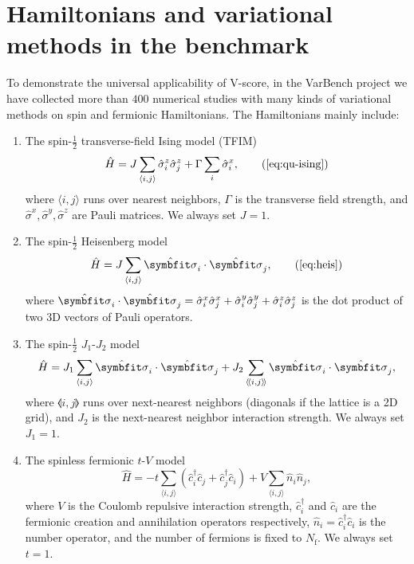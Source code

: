 \section{Hamiltonians and variational methods in the benchmark}

To demonstrate the universal applicability of V-score, in the VarBench project we have collected more than $400$ numerical studies with many kinds of variational methods on spin and fermionic Hamiltonians. The Hamiltonians mainly include:
\begin{enumerate}
\item The spin-$\frac{1}{2}$ transverse-field Ising model (TFIM)
\begin{equation}
\hat{H} = J \sum_{\langle i, j \rangle} \hat{\sigma}^z_i \hat{\sigma}^z_j
+ \Gamma \sum_i \hat{\sigma}^x_i,
\tag{\ref{eq:qu-ising}}
\end{equation}
where $\langle i, j \rangle$ runs over nearest neighbors, $\Gamma$ is the transverse field strength, and $\hat{\sigma}^x, \hat{\sigma}^y, \hat{\sigma}^z$ are Pauli matrices. We always set $J = 1$.

\item The spin-$\frac{1}{2}$ Heisenberg model
\begin{equation}
\hat{H} = J \sum_{\langle i, j \rangle} \hat{\vsi}_i \cdot \hat{\vsi}_j,
\tag{\ref{eq:heis}}
\end{equation}
where $\hat{\vsi}_i \cdot \hat{\vsi}_j = \hat{\sigma}^x_i \hat{\sigma}^x_j + \hat{\sigma}^y_i \hat{\sigma}^y_j + \hat{\sigma}^z_i \hat{\sigma}^z_j$ is the dot product of two 3D vectors of Pauli operators.

\item The spin-$\frac{1}{2}$ $J_1$-$J_2$ model
\begin{equation}
\hat{H} = J_1 \sum_{\langle i, j \rangle} \hat{\vsi}_i \cdot \hat{\vsi}_j
+ J_2 \sum_{\llangle i, j \rrangle} \hat{\vsi}_i \cdot \hat{\vsi}_j,
\end{equation}
where $\llangle i, j \rrangle$ runs over next-nearest neighbors (diagonals if the lattice is a 2D grid), and $J_2$ is the next-nearest neighbor interaction strength. We always set $J_1 = 1$.

\item The spinless fermionic $t$-$V$ model
\begin{equation}
\hat{H} = -t \sum_{\langle i, j \rangle} \left( \hat{c}^\dagger_i \hat{c}_j + \hat{c}^\dagger_j \hat{c}_i \right)
+ V \sum_{\langle i, j \rangle} \hat{n}_i \hat{n}_j,
\end{equation}
where $V$ is the Coulomb repulsive interaction strength, $\hat{c}^\dagger_i$ and $\hat{c}_i$ are the fermionic creation and annihilation operators respectively, $\hat{n}_i = \hat{c}^\dagger_i \hat{c}_i$ is the number operator, and the number of fermions is fixed to $N_\text{f}$. We always set $t = 1$.


\end{enumerate}
